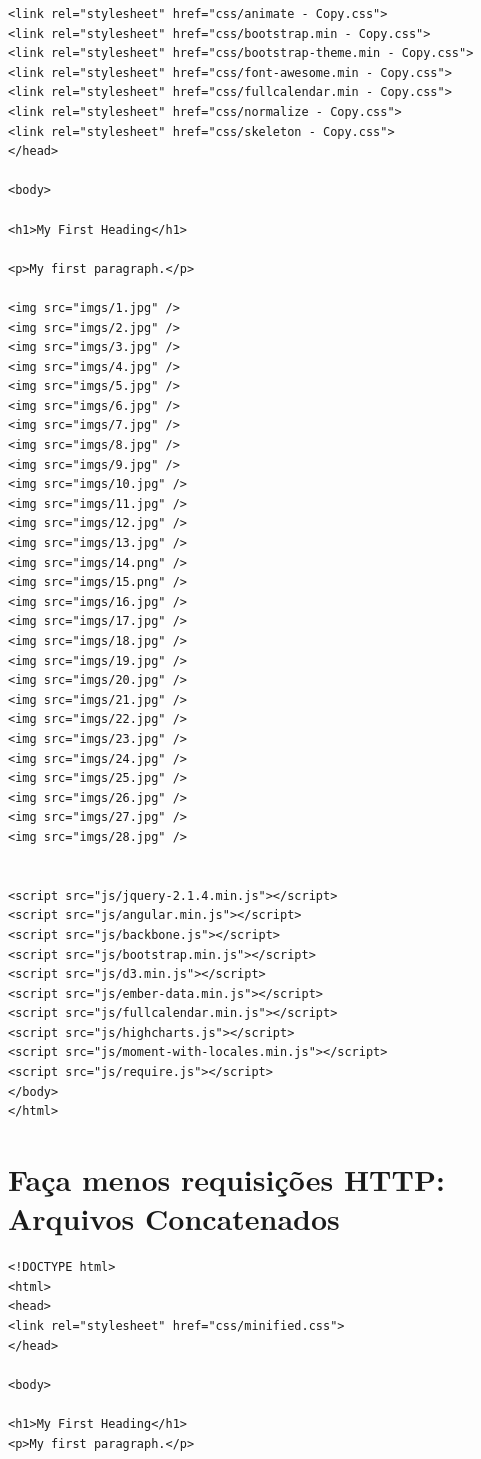 \begin{apendicesenv}
\begin{lstlisting}
<link rel="stylesheet" href="css/animate - Copy.css">
<link rel="stylesheet" href="css/bootstrap.min - Copy.css">
<link rel="stylesheet" href="css/bootstrap-theme.min - Copy.css">
<link rel="stylesheet" href="css/font-awesome.min - Copy.css">
<link rel="stylesheet" href="css/fullcalendar.min - Copy.css">
<link rel="stylesheet" href="css/normalize - Copy.css">
<link rel="stylesheet" href="css/skeleton - Copy.css">
</head>

<body>

<h1>My First Heading</h1>

<p>My first paragraph.</p>

<img src="imgs/1.jpg" />
<img src="imgs/2.jpg" />
<img src="imgs/3.jpg" />
<img src="imgs/4.jpg" />
<img src="imgs/5.jpg" />
<img src="imgs/6.jpg" />
<img src="imgs/7.jpg" />
<img src="imgs/8.jpg" />
<img src="imgs/9.jpg" />
<img src="imgs/10.jpg" />
<img src="imgs/11.jpg" />
<img src="imgs/12.jpg" />
<img src="imgs/13.jpg" />
<img src="imgs/14.png" />
<img src="imgs/15.png" />
<img src="imgs/16.jpg" />
<img src="imgs/17.jpg" />
<img src="imgs/18.jpg" />
<img src="imgs/19.jpg" />
<img src="imgs/20.jpg" />
<img src="imgs/21.jpg" />
<img src="imgs/22.jpg" />
<img src="imgs/23.jpg" />
<img src="imgs/24.jpg" />
<img src="imgs/25.jpg" />
<img src="imgs/26.jpg" />
<img src="imgs/27.jpg" />
<img src="imgs/28.jpg" />
	

<script src="js/jquery-2.1.4.min.js"></script>
<script src="js/angular.min.js"></script>
<script src="js/backbone.js"></script>
<script src="js/bootstrap.min.js"></script>
<script src="js/d3.min.js"></script>
<script src="js/ember-data.min.js"></script>
<script src="js/fullcalendar.min.js"></script>
<script src="js/highcharts.js"></script>
<script src="js/moment-with-locales.min.js"></script>
<script src="js/require.js"></script>
</body>
</html>
\end{lstlisting}

\chapter{Faça menos requisições HTTP: Arquivos Concatenados}
\label{apend:codigo_facamenosrequisicoeshttp_concat}

\begin{lstlisting}
<!DOCTYPE html>
<html>
<head>
<link rel="stylesheet" href="css/minified.css">
</head>

<body>

<h1>My First Heading</h1>
<p>My first paragraph.</p>
	

\end{lstlisting}
\end{apendicesenv}
